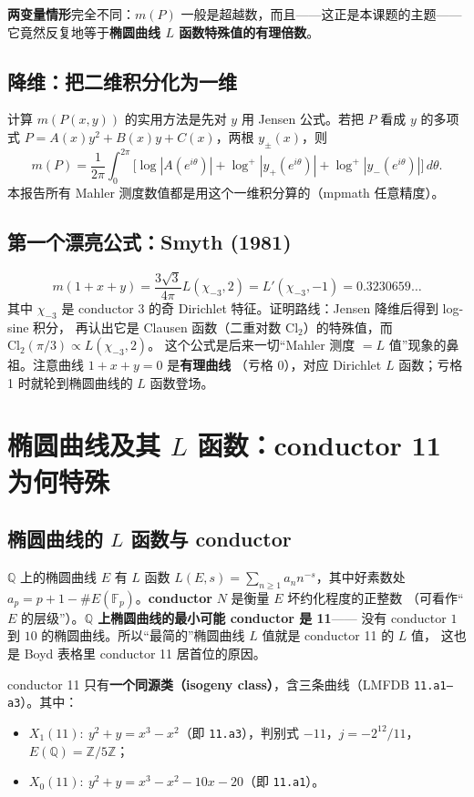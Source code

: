 \documentclass[11pt,a4paper]{ctexart}
\theoremstyle{remark}
\newcommand{\QQ}{\mathbb{Q}}
\newcommand{\ZZ}{\mathbb{Z}}
\newcommand{\dd}{\,d}
\begin{document}
\textbf{两变量情形}完全不同：$m(P)$ 一般是超越数，而且——这正是本课题的主题——
它竟然反复地等于\textbf{椭圆曲线 $L$ 函数特殊值的有理倍数}。

\subsection{降维：把二维积分化为一维}\label{sec:jensen}

计算 $m(P(x,y))$ 的实用方法是先对 $y$ 用 Jensen 公式。若把 $P$ 看成 $y$ 的多项式
$P=A(x)y^2+B(x)y+C(x)$，两根 $y_\pm(x)$，则
\[
m(P)=\frac1{2\pi}\int_0^{2\pi}\Big[\log|A(e^{i\theta})|
+\log^+|y_+(e^{i\theta})|+\log^+|y_-(e^{i\theta})|\Big]\dd\theta.
\]
本报告所有 Mahler 测度数值都是用这个一维积分算的（mpmath 任意精度）。

\subsection{第一个漂亮公式：Smyth (1981)}
\[
m(1+x+y)=\frac{3\sqrt3}{4\pi}L(\chi_{-3},2)=L'(\chi_{-3},-1)=0.3230659\ldots
\]
其中 $\chi_{-3}$ 是 conductor 3 的奇 Dirichlet 特征。证明路线：Jensen 降维后得到 log-sine 积分，
再认出它是 Clausen 函数（二重对数 $\mathrm{Cl}_2$）的特殊值，而
$\mathrm{Cl}_2(\pi/3)\propto L(\chi_{-3},2)$。
这个公式是后来一切“Mahler 测度 $=L$ 值”现象的鼻祖。注意曲线 $1+x+y=0$ 是\textbf{有理曲线}
（亏格 0），对应 Dirichlet $L$ 函数；亏格 1 时就轮到椭圆曲线的 $L$ 函数登场。

\section{椭圆曲线及其 $L$ 函数：conductor 11 为何特殊}

\subsection{椭圆曲线的 $L$ 函数与 conductor}

$\QQ$ 上的椭圆曲线 $E$ 有 $L$ 函数 $L(E,s)=\sum_{n\ge1}a_n n^{-s}$，其中好素数处
$a_p=p+1-\#E(\mathbb{F}_p)$。\textbf{conductor} $N$ 是衡量 $E$ 坏约化程度的正整数
（可看作“$E$ 的层级”）。\textbf{$\QQ$ 上椭圆曲线的最小可能 conductor 是 11}——
没有 conductor $1$ 到 $10$ 的椭圆曲线。所以“最简的”椭圆曲线 $L$ 值就是 conductor 11 的 $L$ 值，
这也是 Boyd 表格里 conductor 11 居首位的原因。

conductor 11 只有\textbf{一个同源类（isogeny class）}，含三条曲线（LMFDB \texttt{11.a1--a3}）。其中：
\begin{itemize}[nosep]
\item $X_1(11):\ y^2+y=x^3-x^2$（即 \texttt{11.a3}），判别式 $-11$，$j=-2^{12}/11$，
$E(\QQ)=\ZZ/5\ZZ$；
\item $X_0(11):\ y^2+y=x^3-x^2-10x-20$（即 \texttt{11.a1}）。
\end{itemize}
\end{document}
